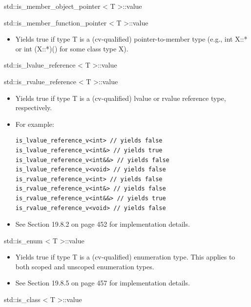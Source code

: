 std::is\_member\_object\_pointer < T >::value

std::is\_member\_function\_pointer < T >::value

\begin{itemize}
\item 
Yields true if type T is a (cv-qualified) pointer-to-member type (e.g., int X::* or int (X::*)() for some class type X).
\end{itemize}

std::is\_lvalue\_reference < T >::value

std::is\_rvalue\_reference < T >::value

\begin{itemize}
\item 
Yields true if type T is a (cv-qualified) lvalue or rvalue reference type, respectively.

\item 
For example:
\begin{lstlisting}[style=styleCXX]
is_lvalue_reference_v<int> // yields false
is_lvalue_reference_v<int&> // yields true
is_lvalue_reference_v<int&&> // yields false
is_lvalue_reference_v<void> // yields false
is_rvalue_reference_v<int> // yields false
is_rvalue_reference_v<int&> // yields false
is_rvalue_reference_v<int&&> // yields true
is_rvalue_reference_v<void> // yields false
\end{lstlisting}

\item 
See Section 19.8.2 on page 452 for implementation details.
\end{itemize}

std::is\_enum < T >::value

\begin{itemize}
\item 
Yields true if type T is a (cv-qualified) enumeration type. This applies to both scoped and unscoped enumeration types.

\item 
See Section 19.8.5 on page 457 for implementation details.
\end{itemize}

std::is\_class < T >::value

